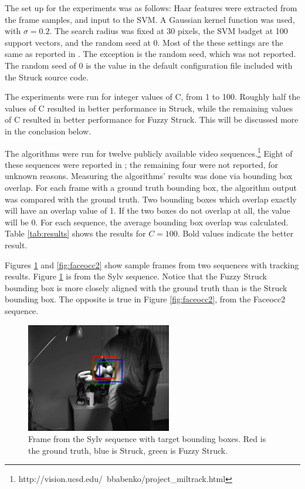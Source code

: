 \documentclass{IEEEtran}
\begin{document}
The set up for the experiments was as follows: Haar features were extracted from the frame samples,
and input to the SVM. A Gaussian kernel function was used, with \(\sigma = 0.2\). The search radius
was fixed at 30 pixels, the SVM budget at 100 support vectors, and the random seed at 0. Most of the
these settings are the same as reported in \cite{6126251}. The exception is the random seed, which
was not reported. The random seed of 0 is the value in the default configuration file included with
the Struck source code.

The experiments were run for integer values of C, from 1 to 100. Roughly half the values of C
resulted in better performance in Struck, while the remaining values of C resulted in better
performance for Fuzzy Struck. This will be discussed more in the conclusion below.

The algorithms were run for twelve publicly available video
sequences.\footnote{http://vision.ucsd.edu/~bbabenko/project\_miltrack.html} Eight of these
sequences were reported in \cite{6126251}; the remaining four were not reported, for unknown
reasons. Measuring the algorithms' results was done via bounding box overlap. For each frame with
a ground truth bounding box, the algorithm output was compared with the ground truth. Two bounding
boxes which overlap exactly will have an overlap value of 1. If the two boxes do not overlap at all,
the value will be 0. For each sequence, the average bounding box overlap was calculated. Table
\ref{tab:results} shows the results for \(C = 100\). Bold values indicate the better result.



Figures \ref{fig:sylv} and \ref{fig:faceocc2} show sample frames from two sequences with tracking
results. Figure \ref{fig:sylv} is from the Sylv sequence. Notice that the Fuzzy Struck bounding box
is more closely aligned with the ground truth than is the Struck bounding box. The opposite is true
in Figure \ref{fig:faceocc2}, from the Faceocc2 sequence.

\begin{figure}[!t]
    \centering
    \includegraphics[width=2.5in]{sylv.png}
    \caption{Frame from the Sylv sequence with target bounding boxes. Red is the ground truth, blue
    is Struck, green is Fuzzy Struck.}
    \label{fig:sylv}
\end{figure}
\end{document}
